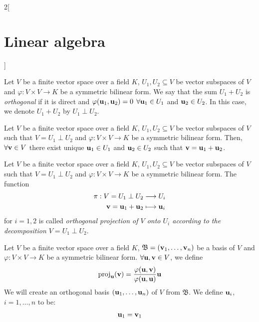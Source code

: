 \documentclass[../../../main.tex]{subfiles}
\begin{document}
\begin{multicols}{2}[\section{Linear algebra}]
\begin{definition}
    Let $V$ be a finite vector space over a field $K$, $U_1,U_2\subseteq V$ be vector subspaces of $V$ and $\varphi:V\times V\rightarrow K$ be a symmetric bilinear form. We say that the sum $U_1+U_2$ is \textit{orthogonal} if it is direct and $\varphi(\boldsymbol{\mathrm{u}}_1,\boldsymbol{\mathrm{u}}_2)=0$ $\forall \boldsymbol{\mathrm{u}}_1\in U_1$ and $\boldsymbol{\mathrm{u}}_2\in U_2$. In this case, we denote $U_1+U_2$ by $U_1\perp U_2$.
  \end{definition}
  \begin{prop}
    Let $V$ be a finite vector space over a field $K$, $U_1,U_2\subseteq V$ be vector subspaces of $V$ such that $V=U_1\perp U_2$ and $\varphi:V\times V\rightarrow K$ be a symmetric bilinear form. Then, $\forall \boldsymbol{\mathrm{v}}\in V$ there exist unique $\boldsymbol{\mathrm{u}}_1\in U_1$ and $\boldsymbol{\mathrm{u}}_2\in U_2$ such that $\boldsymbol{\mathrm{v}}=\boldsymbol{\mathrm{u}}_1+\boldsymbol{\mathrm{u}}_2$.
  \end{prop}
  \begin{definition}\label{perpendicular}
    Let $V$ be a finite vector space over a field $K$, $U_1,U_2\subseteq V$ be vector subspaces of $V$ such that $V=U_1\perp U_2$ and $\varphi:V\times V\rightarrow K$ be a symmetric bilinear form. The function
    \begin{align*}
      \pi:V=U_1\perp U_2                                           & \longrightarrow U_i              \\
      \boldsymbol{\mathrm{v}}=\boldsymbol{\mathrm{u}}_1+\boldsymbol{\mathrm{u}}_2 & \longmapsto \boldsymbol{\mathrm{u}}_i
    \end{align*}
    for $i=1,2$ is called \textit{orthogonal projection of $V$ onto $U_i$ according to the decomposition $V=U_1\perp U_2$}.
  \end{definition}
  \begin{method}
    Let $V$ be a finite vector space over a field $K$, $\mathfrak{B}=(\boldsymbol{\mathrm{v}}_1,\ldots,\boldsymbol{\mathrm{v}}_n)$ be a basis of $V$ and $\varphi:V\times V\rightarrow K$ be a symmetric bilinear form. $\forall\boldsymbol{\mathrm{u}},\boldsymbol{\mathrm{v}}\in V$, we define $$\text{proj}_{\boldsymbol{\mathrm{u}}}(\boldsymbol{\mathrm{v}})=\frac{\varphi(\boldsymbol{\mathrm{u}},\boldsymbol{\mathrm{v}})}{\varphi(\boldsymbol{\mathrm{u}},\boldsymbol{\mathrm{u}})}\boldsymbol{\mathrm{u}}$$ We will create an orthogonal basis $(\boldsymbol{\mathrm{u}}_1,\ldots,\boldsymbol{\mathrm{u}}_n)$ of $V$ from $\mathfrak{B}$. We define $\boldsymbol{\mathrm{u}}_i$, $i=1,\ldots,n$ to be:
    \begin{align*}
      \vectorfunction{u}_1 & =\vectorfunction{v}_1                                                                                                                   \\

\end{align*}
\end{method}
\end{multicols}
\end{document}
